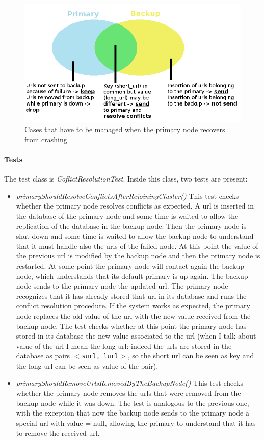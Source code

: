 \documentclass{article}
\begin{document}
\begin{figure}[H]
\centering
\includegraphics[scale=0.45]{sets}
\caption{Cases that have to be managed when the primary node recovers from crashing}
\label{fig:sets}
\end{figure}


\paragraph{Tests} The test class is \textit{CoflictResolutionTest}. Inside this class, two tests are present:
\begin{itemize}
\item \textit{primaryShouldResolveConflictsAfterRejoiningCluster()} This test checks whether the primary node resolves conflicts as expected. A url is inserted in the database of the primary node and some time is waited to allow the replication of the database in the backup node. Then the primary node is shut down and some time is waited to allow the backup node to understand that it must handle also the urls of the failed node. At this point the value of the previous url is modified by the backup node and then the primary node is restarted. At some point the primary node will contact again the backup node, which understands that its default primary is up again. The backup node sends to the primary node the updated url. The primary node recognizes that it has already stored that url in its database and runs the conflict resolution procedure. If the system works as expected, the primary node replaces the old value of the url with the new value received from the backup node. The test checks whether at this point the primary node has stored in its database the new value associated to the url (when I talk about value of the url I mean the long url: indeed the urls are stored in the database as pairs \texttt{$<$surl, lurl$>$}, so the short url can be seen as key and the long url can be seen as value of the pair).
\item \textit{primaryShouldRemoveUrlsRemovedByTheBackupNode()} This test checks whether the primary node removes the urls that were removed from the backup node while it was down. The test is analogous to the previous one, with the exception that now the backup node sends to the primary node a special url with value = null, allowing the primary to understand that it has to remove the received url.
\end{itemize}
\end{document}
